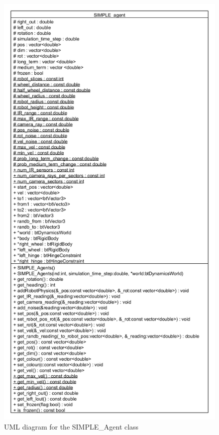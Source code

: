 \begin{figure}[h]
\centering
\includegraphics[scale=0.5]{Chapter2/images/simple_agent_uml.png}
\caption{UML diagram for the SIMPLE\_Agent class}
\label{fig:agent_uml}
\end{figure}


